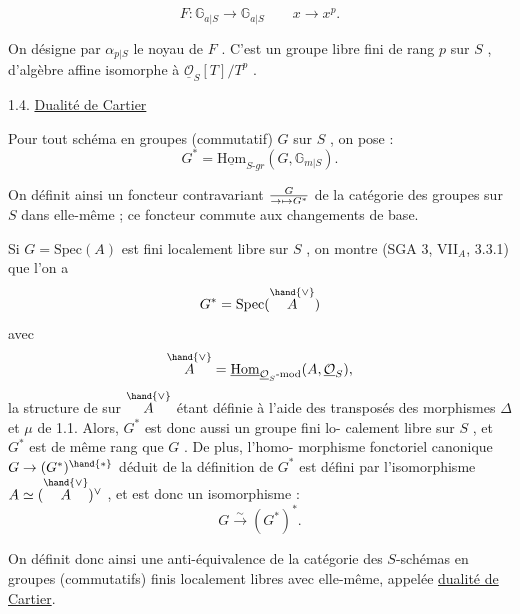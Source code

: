
\[ F : \mathbb{G}_{a|S} \to \mathbb{G}_{a|S} \qquad x \to x^{p} . \]

On désigne par $\alpha_{p|S}$ le noyau de $F$ . C'est un groupe libre fini de rang
$p$ sur $S$ , d'algèbre affine isomorphe à $\underline{\mathcal{O}}_{S}[T]/T^{p}$ .

1.4. \uline{Dualité de Cartier}

Pour tout schéma en groupes (commutatif) $G$ sur $S$ , on pose :
\[ G^{*} = \underline{\mathrm{Hom}}_{S\text{-}gr}(G,\mathbb{G}_{m|S}) . \]

 On définit ainsi un foncteur contravariant $G \over{\to}{\mapsto} G^{*}$ de la catégorie des
groupes sur $S$ dans elle-même ; ce foncteur commute aux changements de base.

Si $G = \mathrm{Spec}(A)$ est fini localement libre sur $S$ , on montre
(SGA 3, VII$_{A}$, 3.3.1) que l'on a
\[ G^{*} = \mathrm{Spec}(\overset{\hand{\vee}}{A}) \]
avec
\[ \overset{\hand{\vee}}{A} = \underline{\mathrm{Hom}}_{\underline{\mathcal{O}}_{S}\text{-mod}}(A,\underline{\mathcal{O}}_{S}) , \]
\margin{$\times$} la structure de  sur $\overset{\hand{\vee}}{A}$ étant définie à l'aide des transposés des
morphismes $\Delta$ et $\mu$ de 1.1. Alors, $G^{*}$ est donc aussi un groupe fini lo-%
calement libre sur $S$ , et $G^{*}$ est de même rang que $G$ . De plus, l'homo-%
\margin{$\times$} morphisme fonctoriel canonique $G \to (G^{*})^{\hand{*}}$ déduit de la définition de $G^{*}$
est défini par l'isomorphisme $A \simeq (\overset{\hand{\vee}}{A})^{\vee}$ , et est donc un isomorphisme :
\[ G \overset{\sim}{\to} (G^{*})^{*} . \]

On définit donc ainsi une anti-équivalence de la catégorie des
$S$-schémas en groupes (commutatifs) finis localement libres avec elle-même,
appelée \uline{dualité de Cartier}.

